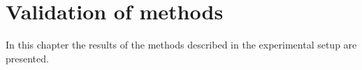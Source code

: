 
\chapter{Validation of methods}
In this chapter the results of the methods described in the experimental setup are presented.  